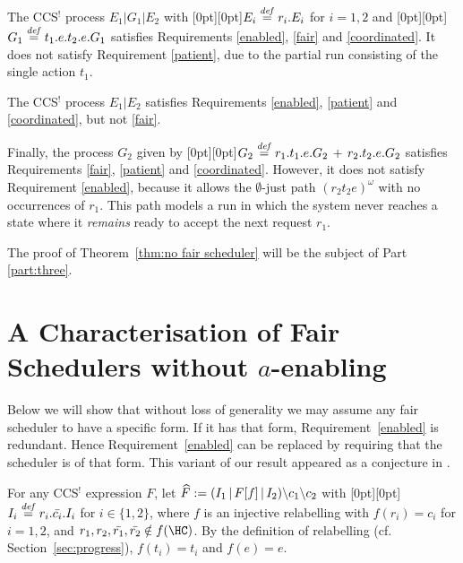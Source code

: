 \documentclass[smallcondensed]{svjour3}
\newcommand{\plat}[1]{\raisebox{0pt}[0pt][0pt]{#1}}  \def\precond#1{{\vphantom{#1}}^\bullet #1}
\newcommand{\Thm}[1]{Theorem~\ref{thm:#1}}
\newcommand{\Part}[1]{Part {\ref{part:#1}}}
\renewcommand{\inf}{^{\omega}}
\newcounter {part}
\begin{document}
The CCS$^!$ process $E_1|G_1|E_2$ with \plat{$E_i \stackrel{\it def}{=} r_i.E_i$} for $i\mathbin=1,2$ and
\plat{$G_1 \stackrel{\it def}{=} t_1.e.t_2.e.G_1$}
satisfies Requirements \ref{enabled}, \ref{fair} and \ref{coordinated}.
It does not satisfy Requirement \ref{patient}, due to the partial run consisting of the single action $t_1$.

The CCS$^!$ process $E_1|E_2$ satisfies
Requirements \ref{enabled}, \ref{patient} and \ref{coordinated}, but not \ref{fair}.
\vspace{2pt}

Finally, the process $G_2$ given by
\plat{$G_2\stackrel{\it def}{=} r_1.t_{1}.e.G_2  \,+\, r_2.t_{2}.e.G_2$}
satisfies Requirements \ref{fair}, \ref{patient} and \ref{coordinated}. However, it does not
satisfy Requirement \ref{enabled}, because it allows the $\emptyset$-just path $(r_2 t_2 e)\inf$
with no occurrences of $r_1$. This path models a run in which the system never reaches a state where
it \emph{remains} ready to accept the next request $r_1$.

The proof of \Thm{no fair scheduler} will be the subject of
\Part{three}.

\section[A Characterisation of Fair Schedulers without enabling]{A Characterisation of Fair Schedulers without $a$-enabling}\label{sec:characterisation}


Below we will show that without loss of generality we may assume
any fair scheduler to have a specific form. If it has that form,
Requirement~\ref{enabled} is redundant. Hence Requirement~\ref{enabled} can be replaced by
requiring that the scheduler is of that form.
This variant of our result appeared as a conjecture in \cite{GH14}.

For any CCS$^!$ expression $F$, let $\widehat F:= (I_1\,|\,F[f]\,|\,I_2)\backslash c_{1}\backslash c_{2}$
with \plat{$I_{i}\stackrel{\it def}{=} r_i.\bar{c_i}.I_{i}$} for $i\in\{1,2\}$,
where $f$ is an injective relabelling with $f(r_i)=c_i$ for $i=1,2$, and
${r_1},{r_2},\bar{r_1},\bar{r_2}\notin f(\HC)$.
By the definition of relabelling (cf. Section~\ref{sec:progress}), $f(t_{i})=t_{i}$ and $f(e)=e$.
\end{document}

